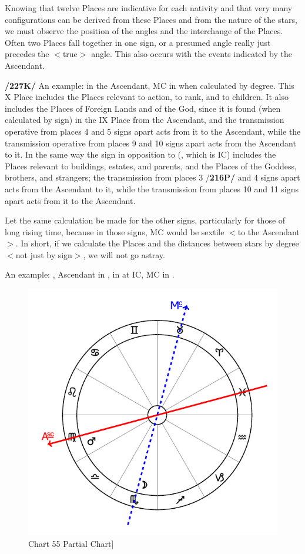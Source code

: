 Knowing that twelve Places are indicative for each nativity and that very many configurations can be derived from these Places and from
the nature of the stars, we must observe the position of the angles and the interchange of the Places. Often two Places fall together in one sign, or a presumed angle really just precedes the $<$true$>$ angle. This also occurs with the events indicated by the Ascendant.

\textbf{/227K/} An example: \Gemini\xspace in the Ascendant, MC in \Aquarius\xspace when calculated by degree. This X Place includes the Places relevant to action, to rank, and to children. It also includes the Places of Foreign Lands and of the God, since it is found (when calculated by sign) in the IX Place from the Ascendant, and the transmission operative from places 4 and 5 signs apart acts from it to the Ascendant, while the transmission operative from places 9 and 10 signs apart acts from the Ascendant to it. In the same way the
sign in opposition to \Aquarius\xspace (\Leo, which is IC) includes the Places relevant to buildings, estates, and parents, and the Places of the Goddess, brothers, and strangers; the transmission from places 3 /\textbf{216P/} and 4 signs apart acts from the Ascendant to it, while the transmission from places 10 and 11 signs apart acts from it to the Ascendant. 

Let the same calculation be made for the other signs, particularly for those of long rising time, because in those signs, MC would be sextile $<$to the Ascendant$>$. In short, if we calculate the Places and the distances between stars by degree $<$not just by sign$>$, we will not go astray.

An example: \Mars, Ascendant in \Virgo, \Moon\xspace in \Scorpio\xspace at IC, MC in \Taurus. 

\begin{figure}
\centering
\vspace{-20pt}
\includegraphics[width=.68\textwidth]{charts/5_09_2}
\caption{Chart 55 Partial Chart]}
\label{fig:chart55}
\end{figure}

